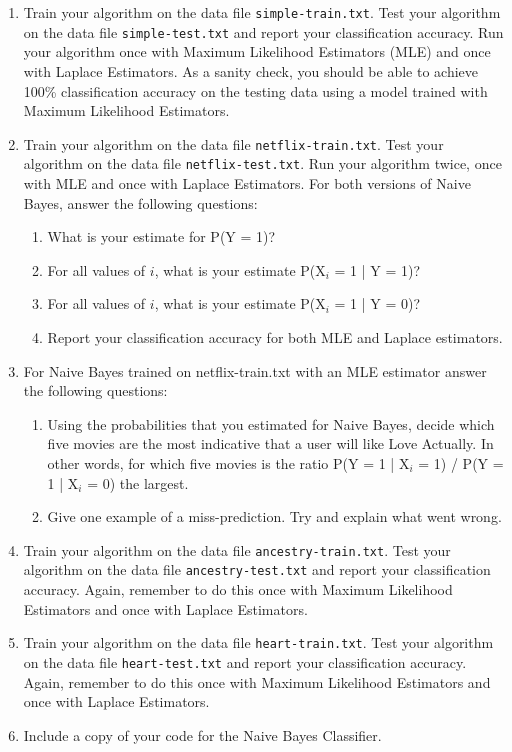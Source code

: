 \documentclass[12pt]{article}
\renewcommand{\(}{\left(}
\renewcommand{\)}{\right)}
\theoremstyle{definition}
\begin{document}
\begin{enumerate}
{{    \begin{enumerate}
        \item Train your algorithm on the data file \texttt{simple-train.txt}. Test your algorithm on the data file \texttt{simple-test.txt} and report your classification accuracy. Run your algorithm once with Maximum Likelihood Estimators (MLE) and once with Laplace Estimators. As a sanity check, you should be able to achieve 100\% classification accuracy on the testing data using a model trained with Maximum Likelihood Estimators.
        \item Train your algorithm on the data file \texttt{netflix-train.txt}. Test your algorithm on the data file \texttt{netflix-test.txt}. Run your algorithm twice, once with MLE and once with Laplace Estimators. For both versions of Naive Bayes, answer the following questions:
        \begin{enumerate}
            \item What is your estimate for P(Y = 1)?
            \item For all values of $i$, what is your estimate P(X$_i$ = 1 | Y = 1)?
            \item For all values of $i$, what is your estimate P(X$_i$ = 1 | Y = 0)?
            \item Report your classification accuracy for both MLE and Laplace estimators.
        \end{enumerate}
        \item For Naive Bayes trained on netflix-train.txt with an MLE estimator answer the following questions:
        \begin{enumerate}
            \item Using the probabilities that you estimated for Naive Bayes, decide which five movies are the most indicative that a user will like Love Actually. In other words, for which five movies is the ratio P(Y = 1 | X$_i$ = 1) / P(Y = 1 | X$_i$ = 0) the largest.
            \item Give one example of a miss-prediction. Try and explain what went wrong.
        \end{enumerate}
        \item Train your algorithm on the data file \texttt{ancestry-train.txt}. Test your algorithm on the data file \texttt{ancestry-test.txt} and report your classification accuracy. Again, remember to do this once with Maximum Likelihood Estimators and once with Laplace Estimators.
        \item Train your algorithm on the data file \texttt{heart-train.txt}. Test your algorithm on the data file \texttt{heart-test.txt} and report your classification accuracy. Again, remember to do this once with Maximum Likelihood Estimators and once with Laplace Estimators.
        \item Include a copy of your code for the Naive Bayes Classifier.
    \end{enumerate}
    
}}
\end{enumerate}
\end{document}

